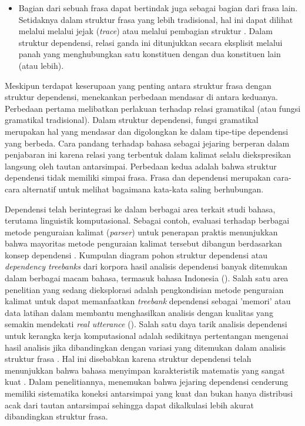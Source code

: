 \begin{itemize}
\item Bagian dari sebuah frasa dapat bertindak juga sebagai bagian dari frasa lain. Setidaknya dalam struktur frasa yang lebih tradisional, hal ini dapat dilihat melalui melalui jejak (\textit{trace}) \citep{chomsky1986barriers} atau melalui pembagian struktur \citep{pollard1994head}. Dalam struktur dependensi, relasi ganda ini ditunjukkan secara eksplisit melalui panah yang menghubungkan satu konstituen dengan dua konstituen lain (atau lebih).
\end{itemize}

Meskipun terdapat keserupaan yang penting antara struktur frasa dengan struktur dependensi, \cite{hudson2007language} menekankan perbedaan mendasar di antara keduanya. Perbedaan pertama melibatkan perlakuan terhadap relasi gramatikal (atau fungsi gramatikal tradisional). Dalam struktur dependensi, fungsi gramatikal merupakan hal yang mendasar dan digolongkan ke dalam tipe-tipe dependensi yang berbeda. Cara pandang \cite{hudson2007language} terhadap bahasa sebagai jejaring berperan dalam penjabaran ini karena relasi yang terbentuk dalam kalimat selalu diekspresikan langsung oleh tautan antarsimpai. Perbedaan kedua adalah bahwa struktur dependensi tidak memiliki simpai frasa. Frasa dan dependensi merupakan cara-cara alternatif untuk melihat bagaimana kata-kata saling berhubungan.  

Dependensi telah berintegrasi ke dalam berbagai area terkait studi bahasa, terutama linguistik komputasional. Sebagai contoh, evaluasi terhadap berbagai metode penguraian kalimat (\textit{parser}) untuk penerapan praktis menunjukkan bahwa mayoritas metode penguraian kalimat tersebut dibangun berdasarkan konsep dependensi \citep{molla2000answer}. Kumpulan diagram pohon struktur dependensi atau \textit{dependency treebanks} dari korpora hasil analisis dependensi banyak ditemukan dalam berbagai macam bahasa, termasuk bahasa Indonesia (\citealp{marcus1993building, abeille2004enriching, carroll2003parser, lin2003dependency, green2012indonesian}). Salah satu area penelitian yang sedang dieksplorasi adalah pengkondisian metode penguraian kalimat untuk dapat memanfaatkan \textit{treebank} dependensi sebagai 'memori' atau data latihan dalam membantu menghasilkan analisis dengan kualitas yang semakin mendekati \textit{real utterance} (\citealp{nivre2006maltparser, nivre2004incrementality}). Salah satu daya tarik analisis dependensi untuk kerangka kerja komputasional adalah sedikitnya pertentangan mengenai hasil analisis jika dibandingkan dengan variasi yang ditemukan dalam analisis struktur frasa \citep{carroll2003parser}. Hal ini disebabkan karena struktur dependensi telah menunjukkan bahwa bahasa menyimpan karakteristik matematis yang sangat kuat \citep{i2004patterns}. Dalam penelitiannya, \cite{i2004patterns} menemukan bahwa jejaring dependensi cenderung memiliki sistematika koneksi antarsimpai yang kuat dan bukan hanya distribusi acak dari tautan antarsimpai sehingga dapat dikalkulasi lebih akurat dibandingkan struktur frasa.


